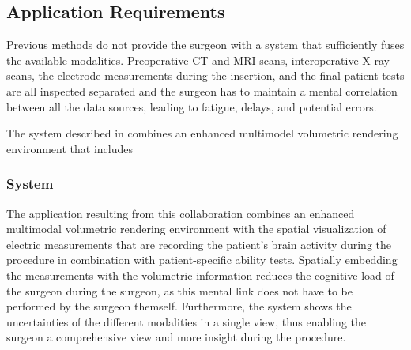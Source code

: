 \subsection{Application Requirements} \label{contributions:dbs:requirements}
Previous methods do not provide the surgeon with a system that sufficiently fuses the available modalities.  Preoperative CT and MRI scans, interoperative X-ray scans, the electrode measurements during the insertion, and the final patient tests are all inspected separated and the surgeon has to maintain a mental correlation between all the data sources, leading to fatigue, delays, and potential errors.  

The system described in  combines an enhanced multimodel  volumetric rendering environment that includes





\subsubsection{System} \label{contributions:dbs:system}




The application resulting from this collaboration combines an enhanced multimodal  volumetric rendering environment with the spatial visualization of electric measurements that are recording the patient's brain activity during the procedure in combination with patient-specific ability tests. Spatially embedding the measurements with the volumetric information reduces the cognitive load of the surgeon during the surgeon, as this mental link does not have to be performed by the surgeon themself. Furthermore, the system shows the uncertainties of the different modalities in a single view, thus enabling the surgeon a comprehensive view and more insight during the procedure.

